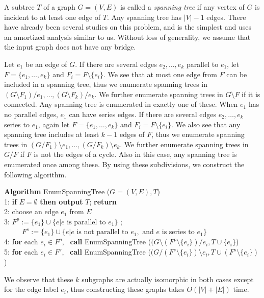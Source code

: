 \documentclass{llncs}
\begin{document}
A subtree $T$ of a graph $G=(V,E)$ is called a {\em spanning tree} if any 
 vertex of $G$ is incident to at least one edge of $T$.
Any spanning tree has $|V|-1$ edges.
There have already been several studies on this
 problem\cite{KpRm95,SrTmUn97,Un99}, and \cite{Un99} is the simplest
 and uses an amortized analysis similar to us.
Without loss of generality, we assume that the input graph does not
 have any bridge.

Let $e_1$ be an edge of $G$.
If there are several edges $e_2,\ldots,e_k$ parallel to $e_1$,
 let $F = \{ e_1,\ldots,e_k\}$ and $F_i = F\setminus \{ e_i\}$.
We see that at most one edge from $F$ can be included in a spanning tree, 
 thus we enumerate spanning trees in $(G\setminus F_1)/e_1,\ldots,
(G\setminus F_k)/e_k$.
We further enumerate spanning trees in $G\setminus F$ if it is connected.
Any spanning tree is enumerated in exactly one of these.
When $e_1$ has no parallel edges, $e_1$ can have series edges.
If there are several edges $e_2,\ldots,e_k$ series to $e_1$, again
 let $F = \{ e_1,\ldots,e_k\}$ and $F_i = F\setminus \{ e_i\}$.
We also see that any spanning tree includes at least $k-1$ edges of $F$,
 thus we enumerate spanning trees in $(G/F_1)\setminus e_1,\ldots, 
 (G/F_k)\setminus e_k$.
We further enumerate spanning trees in $G/F$ if $F$ is not the edges of
 a cycle.
Also in this case, any spanning tree is enumerated once among these.
By using these subdivisions, we construct the following algorithm.

\begin{tabbing}
{\bf Algorithm} EnumSpanningTree ($G=(V,E), T$)\\
1: {\bf if} $E = \emptyset$ {\bf then output} $T$; {\bf return}\\ 
2: choose an edge $e_1$ from $E$\\
3: $F^p := \{ e_1\} \cup \{ e | e \mbox{ is parallel to } e_1\}$ ;\\ 
\ \ \ \ \ $F^s := \{ e_1\} \cup \{ e| e \mbox{ is not parallel to } e_1,
   \mbox{ and } e \mbox{ is series to } e_1\}$\\
4: {\bf for} each $e_i\in F^p$, \ {\bf call} EnumSpanningTree
 ($(G\setminus (F^p\setminus \{e_i\})/ e_i, T\cup \{ e_i\}$)\\
5: {\bf for} each $e_i\in F^s$, \ {\bf call} EnumSpanningTree
 ($(G/ (F^s\setminus \{e_i \})\setminus e_i, T\cup (F^s \setminus \{ e_i\})$)
\end{tabbing}

\noindent
We observe that these $k$ subgraphs are actually isomorphic
 in both cases except for the edge label $e_i$, thus constructing
 these graphs takes $O(|V|+|E|)$ time.
\end{document}
